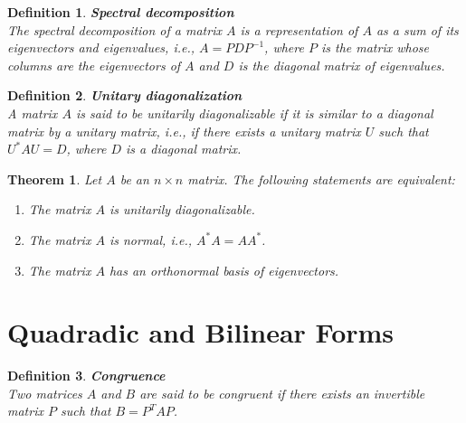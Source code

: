 \documentclass[11pt]{book} %
\newtheorem{theorem}{Theorem}[section]
\newtheorem{definition}{Definition}[section]
\begin{document}
\begin{definition}{\textbf{Spectral decomposition}} \\
    The spectral decomposition of a matrix \( A \) is a representation of \( A \) as a sum of its eigenvectors and eigenvalues, i.e., 
    \( A = PDP^{-1} \), where \( P \) is the matrix whose columns are the eigenvectors of \( A \) and \( D \) is the diagonal matrix of eigenvalues.
\end{definition}

\begin{definition}{\textbf{Unitary diagonalization}} \\
    A matrix \( A \) is said to be unitarily diagonalizable if it is similar to a diagonal matrix by a unitary matrix, i.e., 
    if there exists a unitary matrix \( U \) such that \( U^* A U = D \), where \( D \) is a diagonal matrix.
\end{definition}

\begin{theorem}
    Let \( A \) be an \( n \times n \) matrix. The following statements are equivalent:
    \begin{enumerate}
        \item The matrix \( A \) is unitarily diagonalizable.
        \item The matrix \( A \) is normal, i.e., \( A^* A = A A^* \).
        \item The matrix \( A \) has an orthonormal basis of eigenvectors.
    \end{enumerate}
\end{theorem} 



\section{Quadradic and Bilinear Forms}

\begin{definition}{\textbf{Congruence}} \\
    Two matrices \( A \) and \( B \) are said to be congruent if there exists an invertible matrix \( P \) such that \( B = P^T A P \).
\end{definition}
\end{document}
